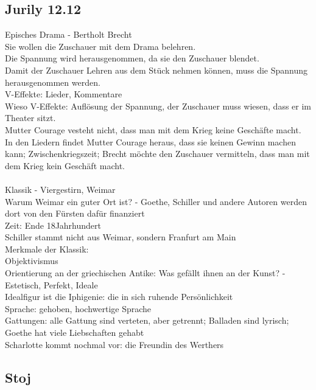 \documentclass[a4paper]{article}
\begin{document}
\subsection{Jurily 12.12}

Episches Drama - Bertholt Brecht\\
Sie wollen die Zuschauer mit dem Drama belehren.\\
Die Spannung wird herausgenommen, da sie den Zuschauer blendet.\\
Damit der Zuschauer Lehren aus dem Stück nehmen können, muss die Spannung herausgenommen werden.\\
V-Effekte: Lieder, Kommentare\\
Wieso V-Effekte: Auflösung der Spannung, der Zuschauer muss wiesen, dass er im Theater sitzt.\\
Mutter Courage vesteht nicht, dass man mit dem Krieg keine Geschäfte macht. In den Liedern findet Mutter Courage heraus, dass sie keinen Gewinn machen kann; Zwischenkriegszeit; Brecht möchte den Zuschauer vermitteln, dass man mit dem Krieg kein Geschäft macht.\\\\

Klassik - Viergestirn, Weimar\\
Warum Weimar ein guter Ort ist? - Goethe, Schiller und andere Autoren werden dort von den Fürsten dafür finanziert\\
Zeit: Ende 18Jahrhundert\\
Schiller stammt nicht aus Weimar, sondern Franfurt am Main\\

Merkmale der Klassik:\\
Objektivismus\\
Orientierung an der griechischen Antike: Was gefällt ihnen an der Kunst? - Estetisch, Perfekt, Ideale\\
Idealfigur ist die Iphigenie: die in sich ruhende Persönlichkeit\\
Sprache: gehoben, hochwertige Sprache\\
Gattungen: alle Gattung sind verteten, aber getrennt; Balladen sind lyrisch; Goethe hat viele Liebschaften gehabt\\
Scharlotte kommt nochmal vor: die Freundin des Werthers\\

\subsection{Stoj}
\end{document}
